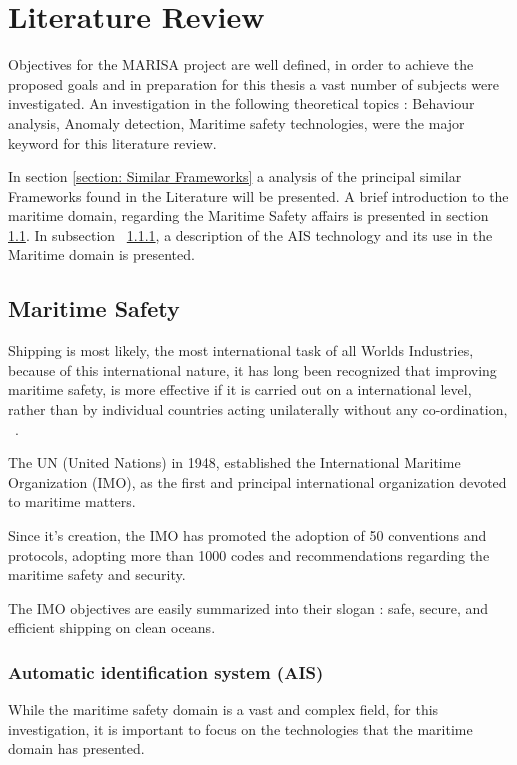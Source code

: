 \chapter{Literature Review}
\label{chapter:literatureReview}

Objectives for the MARISA project are well defined, in order to achieve the proposed goals and in preparation for this thesis a vast number of subjects were investigated. An investigation in the following theoretical topics : Behaviour analysis, Anomaly detection, Maritime safety technologies, were the major keyword for this literature review. 

In section \ref{section: Similar Frameworks} a analysis of the principal similar Frameworks found in the Literature will be presented.
 A brief introduction to the maritime domain, regarding the Maritime Safety affairs is presented in section \ref{section: Maritime Safety}. In subsection ~\ref{subsection: chp2_AIS}, a description of the AIS technology and its use in the Maritime domain is presented.

\section{Maritime Safety}
\label{section: Maritime Safety}

Shipping is most likely, the most international task of all Worlds Industries, because of this international nature, it has long been recognized that improving maritime safety, is more effective if it is  carried out on a international level, rather than by individual countries acting unilaterally without any co-ordination, ~\cite{IMO2016}.

The UN (United Nations) in 1948, established the International Maritime Organization (IMO), as the first and principal international organization devoted to maritime matters. 

Since it's creation, the IMO has promoted the adoption of 50 conventions and protocols, adopting more than 1000 codes and recommendations regarding the maritime safety and security.

The IMO objectives are easily summarized into their slogan : safe, secure, and efficient shipping on clean oceans.

\subsection{Automatic identification system (AIS)}
\label{subsection: chp2_AIS}
While the maritime safety domain is a vast and complex field, for this investigation, it is important to focus on the technologies that the maritime domain has presented.

